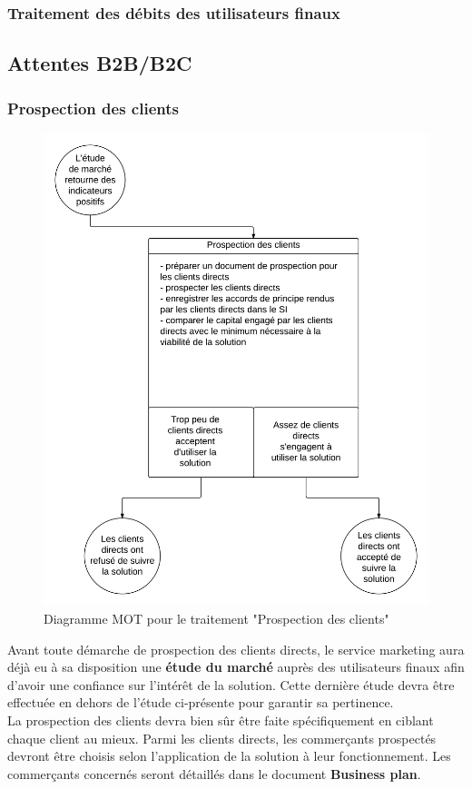 \subsubsection{Traitement des débits des utilisateurs finaux}

\subsection{Attentes B2B/B2C}
\subsubsection{Prospection des clients}

\begin{figure}[ht]
    \centering
    \includegraphics[width=\textwidth]{mot-prospection-clients}
    \caption{Diagramme MOT pour le traitement "Prospection des clients"}
    \label{fig:mot-prospection-clients}
\end{figure}

Avant toute démarche de prospection des clients directs, le service marketing
aura déjà eu à sa disposition une \textbf{étude du marché} auprès des
utilisateurs finaux afin d'avoir une confiance sur l'intérêt de la solution.
Cette dernière étude devra être effectuée en dehors de l'étude ci-présente pour
garantir sa pertinence. \\

La prospection des clients devra bien sûr être faite spécifiquement en ciblant
chaque client au mieux. Parmi les clients directs, les commerçants prospectés
devront être choisis selon l'application de la solution à leur fonctionnement.
Les commerçants concernés seront détaillés dans le document \textbf{Business
plan}.


